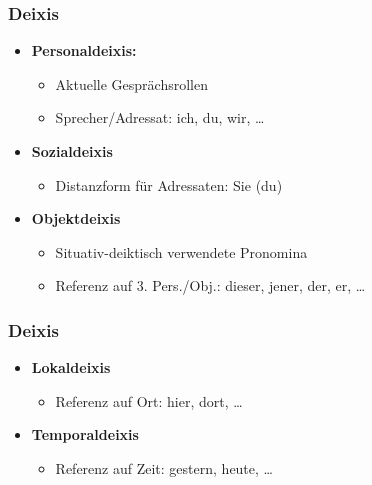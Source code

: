 
\begin{frame}
\frametitle{Deixis}

\begin{itemize}
	\item \textbf{Personaldeixis:} 
	
	\begin{itemize}
		\item Aktuelle Gesprächsrollen
		\item Sprecher/Adressat: ich, du, wir, \dots
	\end{itemize}
	
	\item \textbf{Sozialdeixis}
	
	\begin{itemize}
		\item Distanzform für Adressaten: Sie (\vs du)
	\end{itemize}
	
	\item \textbf{Objektdeixis}
	
	\begin{itemize}
		\item Situativ-deiktisch verwendete Pronomina
		\item Referenz auf 3. Pers./Obj.: dieser, jener, der, er, \dots
	\end{itemize}
	
\end{itemize}

\end{frame}


\begin{frame}
\frametitle{Deixis}

\begin{itemize}
	\item \textbf{Lokaldeixis}
	
	\begin{itemize}
		\item Referenz auf Ort: hier, dort, \dots
	\end{itemize}
	
	\item \textbf{Temporaldeixis}
	
	\begin{itemize}
		\item Referenz auf Zeit: gestern, heute, \dots
	\end{itemize}
	
\end{itemize}

\end{frame}


